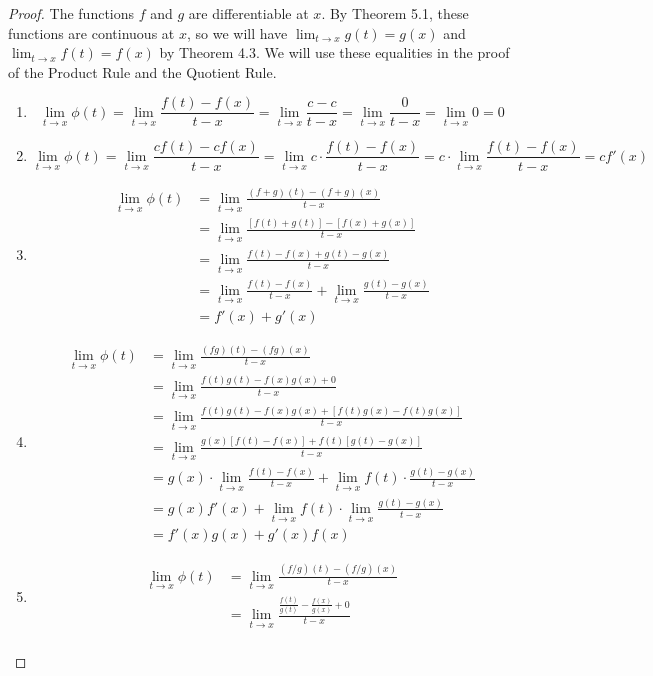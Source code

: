 \documentclass{article}
\theoremstyle{definition}
\begin{document}
\begin{proof} The functions $ f $ and $ g $ are differentiable at $ x $. By Theorem 5.1, these functions are continuous at $ x $, so we will have $ \lim_{t\to x}g(t)=g(x) $ and $ \lim_{t\to x}f(t)=f(x) $ by Theorem 4.3. We will use these equalities in the proof of the Product Rule and the Quotient Rule.
	\begin{enumerate}
	\item $$\lim\limits_{t\to x}\phi(t)=\lim\limits_{t\to x}\frac{f(t)-f(x)}{t-x}=\lim\limits_{t\to x}\frac{c-c}{t-x}=\lim\limits_{t\to x}\frac{0}{t-x}=\lim\limits_{t\to x}0=0 $$
	\item $$\lim\limits_{t\to x}\phi(t)=\lim\limits_{t\to x}\frac{cf(t)-cf(x)}{t-x}=\lim\limits_{t\to x}c\cdot\frac{f(t)-f(x)}{t-x}=c\cdot\lim\limits_{t\to x}\frac{f(t)-f(x)}{t-x}=cf'(x) $$
	\item \begin{align*}
		\lim\limits_{t\to x}\phi(t)&=\lim\limits_{t\to x}\frac{(f+g)(t)-(f+g)(x)}{t-x}\\&=\lim\limits_{t\to x}\frac{[f(t)+g(t)]-[f(x)+g(x)]}{t-x}\\
						&=\lim\limits_{t\to x}\frac{f(t)-f(x)+g(t)-g(x)}{t-x}\\
						&=\lim\limits_{t\to x}\frac{f(t)-f(x)}{t-x}+\lim\limits_{t\to x}\frac{g(t)-g(x)}{t-x}\\
						&=f'(x)+g'(x)
	\end{align*}
	\item \begin{align*}
	\lim\limits_{t\to x}\phi(t)&=\lim\limits_{t\to x}\frac{(fg)(t)-(fg)(x)}{t-x}\\&=\lim\limits_{t\to x}\frac{f(t)g(t)-f(x)g(x)+0}{t-x}\\
	&=\lim\limits_{t\to x}\frac{f(t)g(t)-f(x)g(x)+[f(t)g(x)-f(t)g(x)]}{t-x}\\
		&=\lim\limits_{t\to x}\frac{g(x)[f(t)-f(x)]+f(t)[g(t)-g(x)]}{t-x}\\
	&=g(x)\cdot\lim\limits_{t\to x}\frac{f(t)-f(x)}{t-x}+\lim\limits_{t\to x}f(t)\cdot\frac{g(t)-g(x)}{t-x}\\&=g(x)f'(x)+\lim\limits_{t\to x}f(t)\cdot \lim\limits_{t\to x}\frac{g(t)-g(x)}{t-x}\\&=f'(x)g(x)+g'(x)f(x)
	\end{align*}
	\item 
	\begin{align*}
		\lim\limits_{t\to x}\phi(t)&=\lim\limits_{t\to x}\frac{(f/g)(t)-(f/g)(x)}{t-x}\\
		&=\lim\limits_{t\to x}\frac{\frac{f(t)}{g(t)}-\frac{f(x)}{g(x)}+0}{t-x}\\

\end{align*}
\end{enumerate}
\end{proof}
\end{document}
